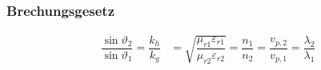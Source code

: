 \subsubsection{Brechungsgesetz}
\begin{align*}
    \dfrac{\sin \vartheta_{2}}{\sin \vartheta_{1}} = \dfrac{k_{h}}{k_{g}} & = \sqrt{\dfrac{\mu_{r 1} \varepsilon_{r 1}}{\mu_{r 2} \varepsilon_{r 2}}} = \dfrac{n_{1}}{n_{2}} = \dfrac{v_{p, 2}}{v_{p, 1}} = \dfrac{\lambda_{2}}{\lambda_{1}} \\
\end{align*}
\newpage
